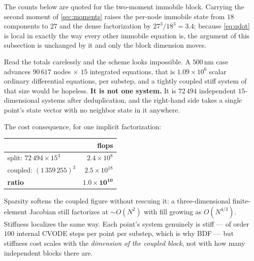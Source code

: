 \documentclass{article}
\begin{document}
The counts below are quoted for the two-moment immobile block. Carrying the
second moment of \cref{sec:moments} raises the per-node immobile state from $18$
components to $27$ and the dense factorization by $27^3/18^3=3.4$; because
\cref{eq:qdot} is local in exactly the way every other immobile equation is, the
argument of this subsection is unchanged by it and only the block dimension
moves.

Read the totals carelessly and the scheme looks impossible. A $500\,$nm case
advances $90\,617$ nodes $\times$ $15$ integrated equations, that is
$1.09\times10^{6}$ scalar ordinary differential equations, per substep, and a
tightly coupled stiff system of that size would be hopeless. \textbf{It is not
one system.} It is $72\,494$ independent $15$-dimensional systems after
deduplication, and the right-hand side takes a single point's state vector with
no neighbor state in it anywhere.

The cost consequence, for one implicit factorization:

\begin{center}
\begin{tabular}{@{}lr@{}}
\toprule
 & flops \\
\midrule
split: $72\,494\times15^3$ & $2.4\times10^{8}$ \\
coupled: $(1\,359\,255)^3$ & $2.5\times10^{18}$ \\
\midrule
\textbf{ratio} & $\mathbf{1.0\times10^{10}}$ \\
\bottomrule
\end{tabular}
\end{center}

Sparsity softens the coupled figure without rescuing it: a three-dimensional
finite-element Jacobian still factorizes at $\sim O(N^2)$ with fill growing as
$O(N^{4/3})$. Stiffness localizes the same way. Each point's system genuinely is
stiff --- of order $100$ internal CVODE steps per point per substep, which is why
BDF --- but stiffness cost scales with the \emph{dimension of the coupled block},
not with how many independent blocks there are.
\end{document}
